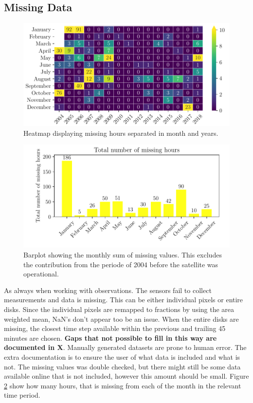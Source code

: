 \subsection{Missing Data} \label{sec:missing_values}
\begin{figure}
    \centering
    \includegraphics[scale = 1.0]{python_figs/heatmap_missing_values.pdf}
    \caption[Heatmap showing missing hours for all months or years.]{Heatmap displaying missing hours separated in month and years.}
    \label{fig:heatmap_missing_values}
\end{figure}
\begin{figure}
    \centering
    \includegraphics[scale = 1.0]{python_figs/heatmap_missing_values_monthly_sum.pdf}
    \caption{Barplot showing the monthly sum of missing values. This excludes the contribution from the periode of 2004 before the satellite was operational.}
    \label{fig:heatmap_missing_values}
\end{figure}
As always when working with observations. The sensors fail to collect  measurements and data is missing. This can be either individual pixels or entire disks. Since the individual pixels are remapped to fractions by using the area weighted mean, NaN's don't appear too be an issue. When the entire disks are missing, the closest time step available within the previous and trailing 45 minutes are chosen.\textbf{ Gaps that not possible to fill in this way are documented in \textbf{X}}. Manually generated datasets are prone to human error. The extra documentation is to ensure the user of what data is included and what is not. The missing values was double checked, but there might still be some data available online that is not included, however this amount should be small. Figure \ref{fig:heatmap_missing_values} show how many hours, that is missing from each of the month in the relevant time period. 

